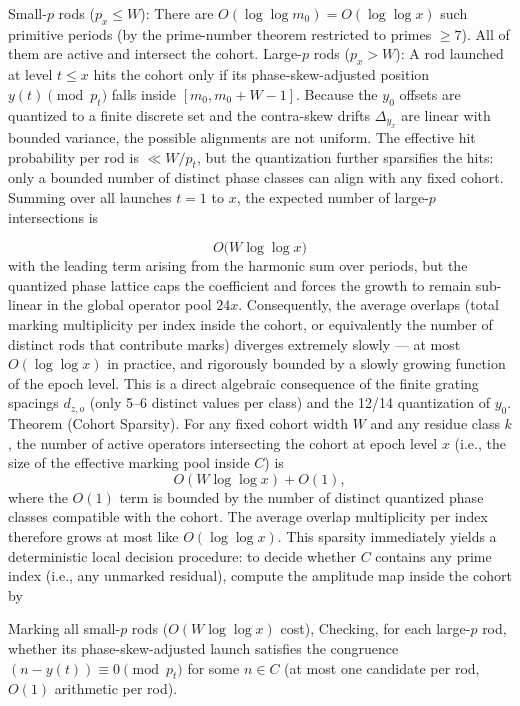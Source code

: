 \documentclass[11pt,a4paper]{article}
\begin{document}
Small-$  p  $ rods ($  p_x \leq W  $): There are $  O(\log\log m_0) = O(\log\log x)  $ such primitive periods (by the prime-number theorem restricted to primes $  \geq 7  $). All of them are active and intersect the cohort.
Large-$  p  $ rods ($  p_x > W  $): A rod launched at level $  t \leq x  $ hits the cohort only if its phase-skew-adjusted position $  y(t) \pmod{p_t}  $ falls inside $  [m_0, m_0+W-1]  $. Because the $  y_0  $ offsets are quantized to a finite discrete set and the contra-skew drifts $  \Delta_{y_x}  $ are linear with bounded variance, the possible alignments are not uniform. The effective hit probability per rod is $  \ll W/p_t  $, but the quantization further sparsifies the hits: only a bounded number of distinct phase classes can align with any fixed cohort. Summing over all launches $  t=1  $ to $  x  $, the expected number of large-$  p  $ intersections is

$$O\bigl(W \log\log x\bigr)$$
with the leading term arising from the harmonic sum over periods, but the quantized phase lattice caps the coefficient and forces the growth to remain sub-linear in the global operator pool $  24x  $.
Consequently, the average overlaps (total marking multiplicity per index inside the cohort, or equivalently the number of distinct rods that contribute marks) diverges extremely slowly — at most $  O(\log\log x)  $ in practice, and rigorously bounded by a slowly growing function of the epoch level. This is a direct algebraic consequence of the finite grating spacings $  d_{z,o}  $ (only 5–6 distinct values per class) and the 12/14 quantization of $  y_0  $.
Theorem (Cohort Sparsity). For any fixed cohort width $  W  $ and any residue class $  k  $, the number of active operators intersecting the cohort at epoch level $  x  $ (i.e., the size of the effective marking pool inside $  C  $) is
$$O(W \log\log x) + O(1),$$
where the $  O(1)  $ term is bounded by the number of distinct quantized phase classes compatible with the cohort. The average overlap multiplicity per index therefore grows at most like $  O(\log\log x)  $.
This sparsity immediately yields a deterministic local decision procedure: to decide whether $  C  $ contains any prime index (i.e., any unmarked residual), compute the amplitude map inside the cohort by

Marking all small-$  p  $ rods ($  O(W \log\log x)  $ cost),
Checking, for each large-$  p  $ rod, whether its phase-skew-adjusted launch satisfies the congruence $  (n - y(t)) \equiv 0 \pmod{p_t}  $ for some $  n\in C  $ (at most one candidate per rod, $  O(1)  $ arithmetic per rod).
\end{document}
